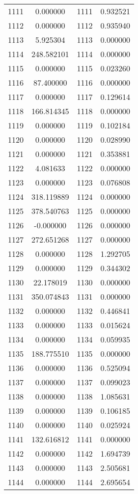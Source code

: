 \documentclass[12pt]{article}
\begin{document}
\begin{longtable}{@{}cccc@{}}
1111 & 0.000000 & 1111 & 0.932521 \\
1112 & 0.000000 & 1112 & 0.935940 \\
1113 & 5.925304 & 1113 & 0.000000 \\
1114 & 248.582101 & 1114 & 0.000000 \\
1115 & 0.000000 & 1115 & 0.023260 \\
1116 & 87.400000 & 1116 & 0.000000 \\
1117 & 0.000000 & 1117 & 0.129614 \\
1118 & 166.814345 & 1118 & 0.000000 \\
1119 & 0.000000 & 1119 & 0.102184 \\
1120 & 0.000000 & 1120 & 0.028990 \\
1121 & 0.000000 & 1121 & 0.353881 \\
1122 & 4.081633 & 1122 & 0.000000 \\
1123 & 0.000000 & 1123 & 0.076808 \\
1124 & 318.119889 & 1124 & 0.000000 \\
1125 & 378.540763 & 1125 & 0.000000 \\
1126 & -0.000000 & 1126 & 0.000000 \\
1127 & 272.651268 & 1127 & 0.000000 \\
1128 & 0.000000 & 1128 & 1.292705 \\
1129 & 0.000000 & 1129 & 0.344302 \\
1130 & 22.178019 & 1130 & 0.000000 \\
1131 & 350.074843 & 1131 & 0.000000 \\
1132 & 0.000000 & 1132 & 0.446841 \\
1133 & 0.000000 & 1133 & 0.015624 \\
1134 & 0.000000 & 1134 & 0.059935 \\
1135 & 188.775510 & 1135 & 0.000000 \\
1136 & 0.000000 & 1136 & 0.525094 \\
1137 & 0.000000 & 1137 & 0.099023 \\
1138 & 0.000000 & 1138 & 1.085631 \\
1139 & 0.000000 & 1139 & 0.106185 \\
1140 & 0.000000 & 1140 & 0.025924 \\
1141 & 132.616812 & 1141 & 0.000000 \\
1142 & 0.000000 & 1142 & 1.694739 \\
1143 & 0.000000 & 1143 & 2.505681 \\
1144 & 0.000000 & 1144 & 2.695654 \\

\end{longtable}
\end{document}
